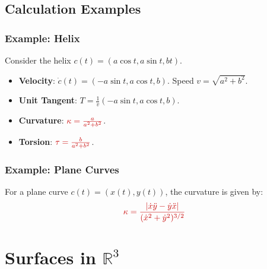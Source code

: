 \documentclass[a4paper,12pt]{article}
\newcommand{\formula}[1]{\textcolor{formulacolor}{#1}}
\begin{document}
\subsection{Calculation Examples}

\subsubsection{Example: Helix}
Consider the helix $c(t) = (a \cos t, a \sin t, bt)$.
\begin{itemize}
    \item \textbf{Velocity}: $\dot{c}(t) = (-a \sin t, a \cos t, b)$. Speed $v = \sqrt{a^2 + b^2}$.
    \item \textbf{Unit Tangent}: $T = \frac{1}{v}(-a \sin t, a \cos t, b)$.
    \item \textbf{Curvature}: $\formula{\kappa = \frac{a}{a^2 + b^2}}$.
    \item \textbf{Torsion}: $\formula{\tau = \frac{b}{a^2 + b^2}}$.
\end{itemize}

\subsubsection{Example: Plane Curves}
For a plane curve $c(t) = (x(t), y(t))$, the curvature is given by:
\begin{equation}
    \formula{\kappa = \frac{|\dot{x}\ddot{y} - \dot{y}\ddot{x}|}{(\dot{x}^2 + \dot{y}^2)^{3/2}}}
\end{equation}

\section{Surfaces in $\mathbb{R}^3$}
\end{document}
